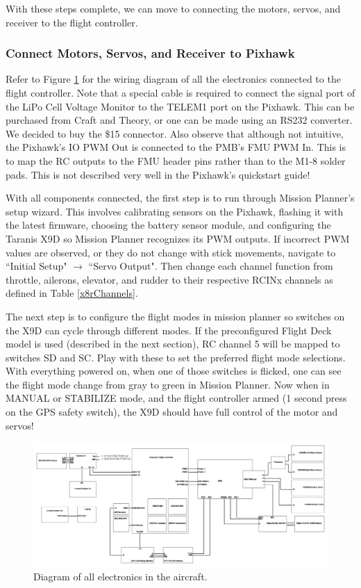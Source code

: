 \documentclass[12pt,journal,compsoc]{IEEEtran}
\begin{document}
With these steps complete, we can move to connecting the motors, servos, and receiver to the flight controller.

\subsubsection{Connect Motors, Servos, and Receiver to Pixhawk}
Refer to Figure \ref{mainScheme} for the wiring diagram of all the electronics connected to the flight controller. Note that a special cable is required to connect the signal port of the LiPo Cell Voltage Monitor to the TELEM1 port on the Pixhawk. This can be purchased from Craft and Theory, or one can be made using an RS232 converter. We decided to buy the \$15 connector. Also observe that although not intuitive, the Pixhawk's IO PWM Out is connected to the PMB's FMU PWM In. This is to map the RC outputs to the FMU header pins rather than to the M1-8 solder pads. This is not described very well in the Pixhawk's quickstart guide!

With all components connected, the first step is to run through Mission Planner's setup wizard. This involves calibrating sensors on the Pixhawk, flashing it with the latest firmware, choosing the battery sensor module, and configuring the Taranis X9D so Mission Planner recognizes its PWM outputs. If incorrect PWM values are observed, or they do not change with stick movements, navigate to ``Initial Setup" $\rightarrow$ ``Servo Output". Then change each channel function from throttle, ailerons, elevator, and rudder to their respective RCINx channels as defined in Table \ref{x8rChannels}.

The next step is to configure the flight modes in mission planner so switches on the X9D can cycle through different modes. If the preconfigured Flight Deck model is used (described in the next section), RC channel 5 will be mapped to switches SD and SC. Play with these to set the preferred flight mode selections. With everything powered on, when one of those switches is flicked, one can see the flight mode change from gray to green in Mission Planner. Now when in MANUAL or STABILIZE mode, and the flight controller armed (1 second press on the GPS safety switch), the X9D should have full control of the motor and servos!\\

\begin{figure}[h]
\hspace*{0cm}
\centering
\includegraphics[width=\textwidth]{hardwareBlockDiagram.png}
\caption{Diagram of all electronics in the aircraft.}
\label{mainScheme}
\end{figure}
\end{document}

